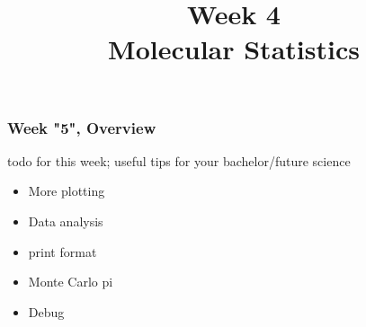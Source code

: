 

\usepackage{soul}

\title[]{Week 4\\Molecular Statistics}








{
\usebackgroundtemplate{}
\begin{frame}[plain]
    \titlepage
    \addtocounter{framenumber}{-1}
\end{frame}
}

\begin{frame}[fragile]

    \frametitle{Week "5", Overview}

    todo for this week; useful tips for your bachelor/future science

    \begin{itemize}
        \item More plotting
        \item Data analysis
        \item print format
        \item Monte Carlo pi
        \item Debug
    \end{itemize}

\end{frame}


